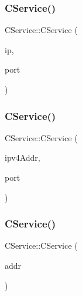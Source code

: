 \subsubsection{\texorpdfstring{C\+Service()}{CService()}\hspace{0.1cm}{\footnotesize\ttfamily [2/10]}}
{\footnotesize\ttfamily C\+Service\+::\+C\+Service (\begin{DoxyParamCaption}\item[{const \mbox{\hyperlink{class_c_net_addr}{C\+Net\+Addr}} \&}]{ip,  }\item[{unsigned short}]{port }\end{DoxyParamCaption})}

\mbox{\label{class_c_service_a1fcc14e589f6d3e92b43707a5f71368f}} 
\subsubsection{\texorpdfstring{C\+Service()}{CService()}\hspace{0.1cm}{\footnotesize\ttfamily [3/10]}}
{\footnotesize\ttfamily C\+Service\+::\+C\+Service (\begin{DoxyParamCaption}\item[{const struct in\+\_\+addr \&}]{ipv4\+Addr,  }\item[{unsigned short}]{port }\end{DoxyParamCaption})}

\mbox{\label{class_c_service_aa54fd9204530445647cd3d45056881e9}} 
\subsubsection{\texorpdfstring{C\+Service()}{CService()}\hspace{0.1cm}{\footnotesize\ttfamily [4/10]}}
{\footnotesize\ttfamily C\+Service\+::\+C\+Service (\begin{DoxyParamCaption}\item[{const struct sockaddr\+\_\+in \&}]{addr }\end{DoxyParamCaption})}

\mbox{\label{class_c_service_a75b2a3cfa16642b0fcd74382203a9fdc}} 
